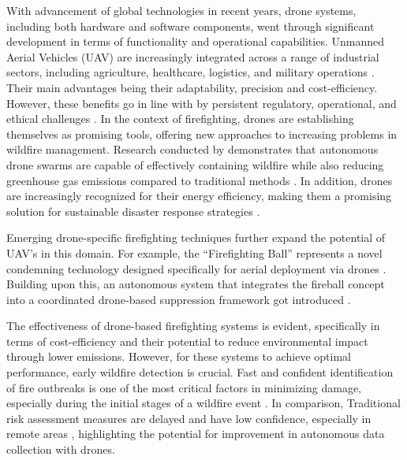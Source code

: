 \documentclass[twoside]{article}
\begin{document}
With advancement of global technologies in recent years, drone systems, including both hardware and software components, went through significant development in terms of functionality and operational capabilities. Unmanned Aerial Vehicles (UAV) are increasingly integrated across a range of industrial sectors, including agriculture, healthcare, logistics, and military operations \citep{emimiCurrentOpportunitiesChallenges2023}. Their main advantages being their adaptability, precision and cost-efficiency. However, these benefits go in line with by persistent regulatory, operational, and ethical challenges \citep{emimiCurrentOpportunitiesChallenges2023}.
In the context of firefighting, drones are establishing themselves as promising tools, offering new approaches to increasing problems in wildfire management. Research conducted by \citet*{Saffre2022} demonstrates that autonomous drone swarms are capable of effectively containing wildfire while also reducing greenhouse gas emissions compared to traditional methods \citep{Saffre2022}. In addition, drones are increasingly recognized for their energy efficiency, making them a promising solution for sustainable disaster response strategies \citep{stolaroffEnergyUseLife2018}.

Emerging drone-specific firefighting techniques further expand the potential of UAV's in this domain. For example, the “Firefighting Ball” represents a novel condemning technology designed specifically for aerial deployment via drones \citep{fireBalls}. Building upon this, an autonomous system that integrates the fireball concept into a coordinated drone-based suppression framework got introduced \citep{alkhatibProposedAutomaticForest2024}.

The effectiveness of drone-based firefighting systems is evident, specifically in terms of cost-efficiency and their potential to reduce environmental impact through lower emissions. However, for these systems to achieve optimal performance, early wildfire detection is crucial. Fast and confident identification of fire outbreaks is one of the most critical factors in minimizing damage, especially during the initial stages of a wildfire event \citep{Sudhakar2020}.
In comparison, Traditional risk assessment measures are delayed and have low confidence, especially in remote areas \citep{Afghah2019}, highlighting the potential for improvement in autonomous data collection \citep{Lelis2024} with drones.
\end{document}
